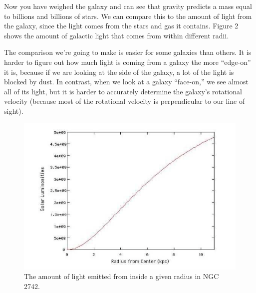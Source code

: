 \documentclass[11pt]{article}%
\begin{document}
\noindent
Now you have weighed the galaxy and can see that gravity predicts a mass equal to billions and billions of stars.  We can compare this to the amount of light from the galaxy, since the light comes from the stars and gas it contains.  Figure 2 shows the amount of galactic light that comes from within different radii. 

\medskip \noindent
The comparison we're going to make is easier for some galaxies than others. It is harder to figure out how much light is coming from a galaxy the more ``edge-on'' it is, because if we are looking at the side of the galaxy, a lot of the light is blocked by dust. 
In contrast, when we look at a galaxy ``face-on,'' we see almost all of its light, but it is harder to accurately determine the galaxy's rotational velocity (because most of the rotational velocity is perpendicular to our line of sight).


\begin{figure}[h!]
\center
\includegraphics[scale=0.6]{Images/enclosed_luminosity.png}
\caption{The amount of light emitted from inside a given radius in NGC 2742.}
\label{luminosity}
\end{figure}
\end{document}
